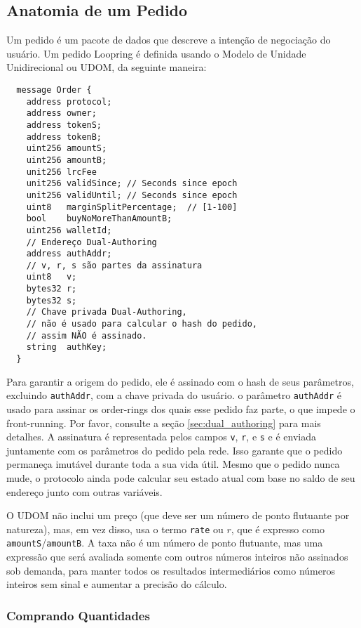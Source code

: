 \documentclass[UTF8,nofonts]{article}
\begin{document}
\begin{multicols}{2}
\subsection{Anatomia de um Pedido\label{anatomy}}
Um pedido é um pacote de dados que descreve a intenção de negociação do usuário. Um pedido Loopring é definida usando o Modelo de Unidade Unidirecional ou UDOM, da seguinte maneira:

\begin{verbatim}
  message Order {
    address protocol;
    address owner;
    address tokenS;
    address tokenB;
    uint256 amountS;
    uint256 amountB;
    unit256 lrcFee
    unit256 validSince; // Seconds since epoch
    unit256 validUntil; // Seconds since epoch
    uint8   marginSplitPercentage;  // [1-100]
    bool    buyNoMoreThanAmountB;
    uint256 walletId;
    // Endereço Dual-Authoring 
    address authAddr;
   	// v, r, s são partes da assinatura
    uint8   v;       
    bytes32 r;
    bytes32 s;
    // Chave privada Dual-Authoring,
    // não é usado para calcular o hash do pedido,
    // assim NÃO é assinado.
    string  authKey;          
  }
\end{verbatim}


Para garantir a origem do pedido, ele é assinado com o hash de seus parâmetros, excluindo \verb|authAddr|, com a chave privada do usuário. o parâmetro \verb|authAddr| é usado para assinar os order-rings dos quais esse pedido faz parte, o que impede o front-running. Por favor, consulte a seção \ref{sec:dual_authoring} para mais detalhes. A assinatura é representada pelos campos \verb|v|, \verb|r|, e \verb|s| e é enviada juntamente com os parâmetros do pedido pela rede. Isso garante que o pedido permaneça imutável durante toda a sua vida útil. Mesmo que o pedido nunca mude, o protocolo ainda pode calcular seu estado atual com base no saldo de seu endereço junto com outras variáveis.



O UDOM não inclui um preço (que deve ser um número de ponto flutuante por natureza), mas, em vez disso, usa o termo \verb|rate| ou $r$, que é expresso como \verb|amountS|/\verb|amountB|. A taxa não é um número de ponto flutuante, mas uma expressão que será avaliada somente com outros números inteiros não assinados sob demanda, para manter todos os resultados intermediários como números inteiros sem sinal e aumentar a precisão do cálculo.

\subsubsection{Comprando Quantidades}



\end{multicols}
\end{document}
